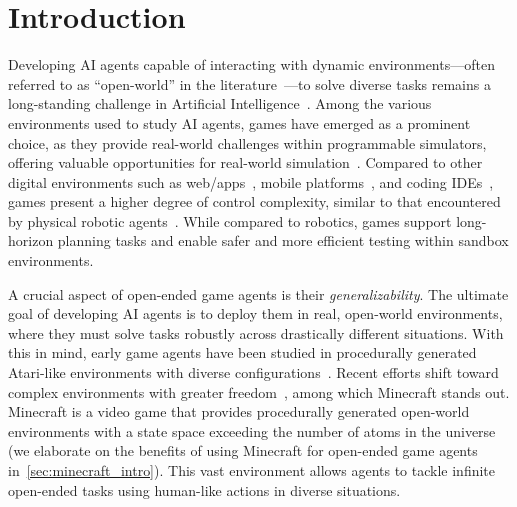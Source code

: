 
\section{Introduction}

\label{sec:intro}


Developing AI agents capable of interacting with dynamic environments—often referred to as ``open-world'' in the literature~\citep{open-world}—to solve diverse tasks remains a long-standing challenge in Artificial Intelligence~\citep{kejriwal2024challenges}. Among the various environments used to study AI agents, games have emerged as a prominent choice, as they provide real-world challenges within programmable simulators, offering valuable opportunities for real-world simulation~\citep{genie, gato, deepmind_sima}. Compared to other digital environments such as web/apps~\citep{web-env-autoagent, UI-TARS-ui, Showui-ui}, mobile platforms~\citep{mobile-pan, Mobile-agent}, and coding IDEs~\citep{code-challenge, swe-bench, agent-coder}, games present a higher degree of control complexity, similar to that encountered by physical robotic agents~\citep{robocasa, robo-gensim, robo-auto}. While compared to robotics, games support long-horizon planning tasks and enable safer and more efficient testing within sandbox environments. 


A crucial aspect of open-ended game agents is their \emph{generalizability}. The ultimate goal of developing AI agents is to deploy them in real, open-world environments, where they must solve tasks robustly across drastically different situations. With this in mind, early game agents have been studied in procedurally generated Atari-like environments with diverse configurations~\citep{procegen}. Recent efforts shift toward complex environments with greater freedom~\citep{minedojo,crafter,xland}, among which Minecraft stands out. Minecraft is a video game that provides procedurally generated open-world environments with a state space exceeding the number of atoms in the universe (we elaborate on the benefits of using Minecraft for open-ended game agents in~\cref{sec:minecraft_intro}). This vast environment allows agents to tackle infinite open-ended tasks using human-like actions in diverse situations. 


